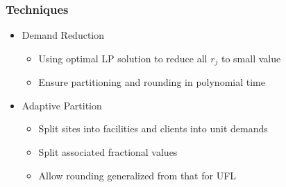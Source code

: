 \documentclass[handout, hyperref, dvipsnames]{beamer}
\begin{document}
\begin{frame}
  \frametitle{Techniques}
  \begin{itemize}
  \item Demand Reduction
    \begin{itemize}
    \item Using optimal LP solution to reduce all $r_j$ to small value
    \item Ensure partitioning and rounding in polynomial time
    \end{itemize}
    
  \item Adaptive Partition
    \begin{itemize}
    \item Split sites into facilities and clients into unit demands
    \item Split associated fractional values
    \item Allow rounding generalized from that for UFL
    \end{itemize}
  \end{itemize}
\end{frame}
\end{document}
